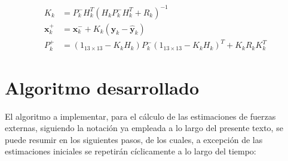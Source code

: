 \begin{equation}
\begin{split}
	K_k &= P_k^{-}H_k^T (H_k P_k^{-}H_k^T + R_k)^{-1} \\
	\boldsymbol{x}_k^{+} &= \boldsymbol{x}_k^{-} + K_k( \boldsymbol{y}_k - \boldsymbol{\hat{y}}_k) \\
	P_k^{+} &= (1_{13\times13} - K_kH_k)P_k^{-}(1_{13\times13} - K_kH_k)^T + K_kR_kK_k^T
\end{split}
\end{equation}

\section{Algoritmo desarrollado}
\label{sec:AlgoritObservador}

El algoritmo a implementar, para el cálculo de las estimaciones de fuerzas externas, siguiendo la notación ya empleada a lo largo del presente texto, se puede resumir en los siguientes pasos, de los cuales, a excepción de las estimaciones iniciales se repetirán cíclicamente a lo largo del tiempo:

